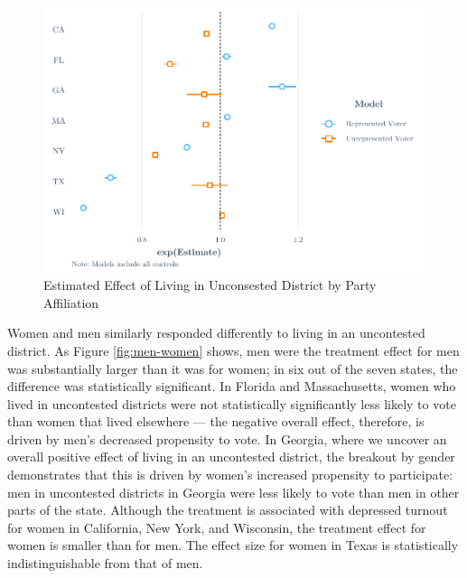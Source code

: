 \documentclass[
  12pt,
]{article}
\begin{document}
\begin{figure}[H]

{\centering \includegraphics{write_files/figure-latex/party-1} 

}

\caption{\label{fig:party}Estimated Effect of Living in Unconsested District by Party Affiliation}\label{fig:party}
\end{figure}

Women and men similarly responded differently to living in an uncontested district. As Figure \ref{fig:men-women} shows, men were the treatment effect for men was substantially larger than it was for women; in six out of the seven states, the difference was statistically significant. In Florida and Massachusetts, women who lived in uncontested districts were not statistically significantly less likely to vote than women that lived elsewhere --- the negative overall effect, therefore, is driven by men's decreased propensity to vote. In Georgia, where we uncover an overall positive effect of living in an uncontested district, the breakout by gender demonstrates that this is driven by women's increased propensity to participate: men in uncontested districts in Georgia were less likely to vote than men in other parts of the state. Although the treatment is associated with depressed turnout for women in California, New York, and Wisconsin, the treatment effect for women is smaller than for men. The effect size for women in Texas is statistically indistinguishable from that of men.
\end{document}
